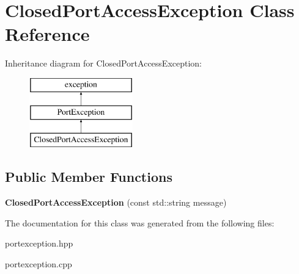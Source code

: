 \hypertarget{class_closed_port_access_exception}{}\section{Closed\+Port\+Access\+Exception Class Reference}
\label{class_closed_port_access_exception}
Inheritance diagram for Closed\+Port\+Access\+Exception\+:\begin{figure}[H]
\begin{center}
\leavevmode
\includegraphics[height=3.000000cm]{class_closed_port_access_exception}
\end{center}
\end{figure}
\subsection*{Public Member Functions}
\begin{DoxyCompactItemize}
\item 
\hypertarget{class_closed_port_access_exception_aa66df922ca194ecd6431bd9cae0a4b24}{}{\bfseries Closed\+Port\+Access\+Exception} (const std\+::string message)\label{class_closed_port_access_exception_aa66df922ca194ecd6431bd9cae0a4b24}

\end{DoxyCompactItemize}


The documentation for this class was generated from the following files\+:\begin{DoxyCompactItemize}
\item 
portexception.\+hpp\item 
portexception.\+cpp\end{DoxyCompactItemize}
